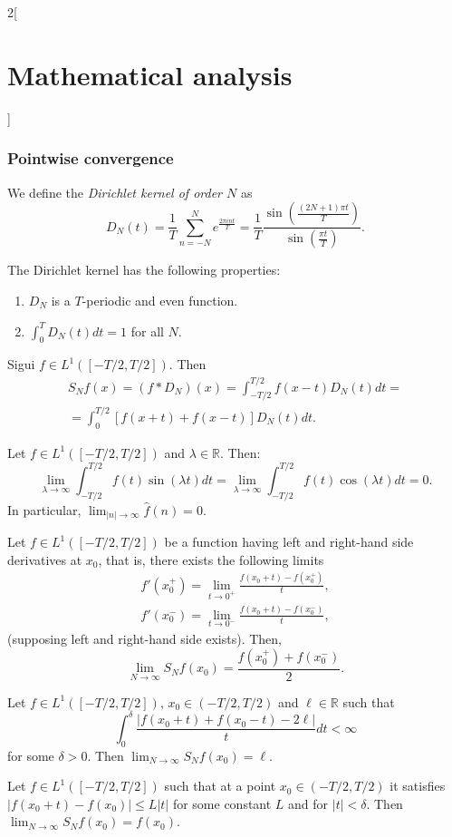 \documentclass[class=article,crop=false]{standalone}
\begin{document}
\begin{multicols}{2}[\section{Mathematical analysis}]
\subsubsection{Pointwise convergence}
\begin{definition}
We define the \textit{Dirichlet kernel of order $N$} as $$D_N(t)=\frac{1}{T}\sum_{n=-N}^Ne^{\frac{2\pi int}{T}}=\frac{1}{T}\frac{\sin\left(\frac{(2N+1)\pi t}{T}\right)}{\sin\left(\frac{\pi t}{T}\right)}.$$
\end{definition}
\begin{prop}
The Dirichlet kernel has the following properties:
\begin{enumerate}
    \item $D_N$ is a $T$-periodic and even function.
    \item $\displaystyle\int_0^TD_N(t)dt=1$ for all $N$.
\end{enumerate}
\end{prop}
\begin{prop}
Sigui $f\in L^1([-T/2,T/2])$. Then \begin{multline*}
    S_Nf(x)=(f*D_N)(x)=\int_{-T/2}^{T/2}f(x-t)D_N(t)dt=\\=\int_0^{T/2}[f(x+t)+f(x-t)]D_N(t)dt.
\end{multline*}
\end{prop}
\begin{lemma}
Let $f\in L^1([-T/2,T/2])$ and $\lambda\in\mathbb{R}$. Then: $$\lim_{\lambda\to\infty}\int_{-T/2}^{T/2}f(t)\sin(\lambda t)dt=\lim_{\lambda\to\infty}\int_{-T/2}^{T/2}f(t)\cos(\lambda t)dt=0.$$ In particular, $\displaystyle\lim_{|n|\to\infty}\widehat{f}(n)=0$.
\end{lemma}
\begin{theorem}
Let $f\in L^1([-T/2,T/2])$ be a function having left and right-hand side derivatives at $x_0$, that is, there exists the following limits
\begin{gather*}f'(x_0^+)=\lim_{t\to0^+}\frac{f(x_0+t)-f(x_0^+)}{t},\\ f'(x_0^-)=\lim_{t\to0^-}\frac{f(x_0+t)-f(x_0^-)}{t},\end{gather*}(supposing left and right-hand side exists). Then, $$\lim_{N\to\infty}S_Nf(x_0)=\frac{f(x_0^+)+f(x_0^-)}{2}.$$
\end{theorem}
\begin{theorem}
Let $f\in L^1([-T/2,T/2])$, $x_0\in (-T/2,T/2)$ and $\ell\in\mathbb{R}$ such that $$\int_0^\delta\frac{|f(x_0+t)+f(x_0-t)-2\ell|}{t}dt<\infty$$ for some $\delta>0$. Then $\displaystyle\lim_{N\to\infty}S_Nf(x_0)=\ell$.
\end{theorem}
\begin{theorem}
Let $f\in L^1([-T/2,T/2])$ such that at a point $x_0\in (-T/2,T/2)$ it satisfies $|f(x_0+t)-f(x_0)|\leq L|t|$ for some constant $L$ and for $|t|<\delta$. Then $\displaystyle\lim_{N\to\infty}S_Nf(x_0)=f(x_0)$.
\end{theorem}

\end{multicols}
\end{document}

